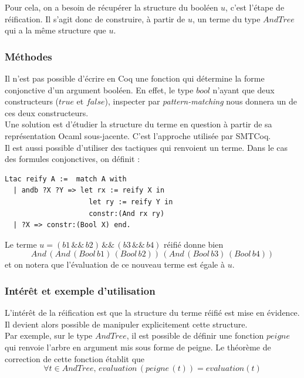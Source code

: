 \documentclass[11pt]{article}
\begin{document}
Pour cela, on a besoin de récupérer la structure du booléen $u$, c'est l'étape de réification. Il s'agit donc de construire, à partir de $u$, un terme du type $AndTree$ qui a la même structure que $u$.

\subsubsection{Méthodes}

Il n'est pas possible d'écrire en Coq une fonction qui détermine la forme conjonctive d'un argument booléen. En effet, le type $bool$ n'ayant que deux constructeurs ($true$ et $false$), inspecter par \textit{pattern-matching} nous donnera un de ces deux constructeurs.\\

Une solution est d'étudier la structure du terme en question à partir de sa représentation Ocaml sous-jacente. C'est l'approche utilisée par SMTCoq. \\

Il est aussi possible d'utiliser des tactiques qui renvoient un terme. Dans le cas des formules conjonctives, on définit :

\begin{lstlisting}[frame=single]
Ltac reify A :=  match A with
  | andb ?X ?Y => let rx := reify X in
                    let ry := reify Y in
                    constr:(And rx ry)
  | ?X => constr:(Bool X) end.

\end{lstlisting}

Le terme $u = (b1\,\&\&\,b2)\,\&\&\,(b3\,\&\&\,b4)$ réifié donne bien 
\[And\,(And\,(Bool\,b1)\,(Bool\,b2))\,(And\,(Bool\,b3)\,(Bool\,b4))\] 
et on notera que l'évaluation de ce nouveau terme est égale à $u$.



\subsubsection{Intérêt et exemple d'utilisation}

L'intérêt de la réification est que la structure du terme réifié est mise en évidence. Il devient alors possible de manipuler explicitement cette structure. \\

Par exemple, sur le type $AndTree$, il est possible de définir une fonction $peigne$ qui renvoie l'arbre en argument mis sous forme de peigne. Le théorème de correction de cette fonction établit que 
\[ \forall t \in AndTree, \, evaluation \, (peigne \, (t)) = evaluation (t) \]
\end{document}
